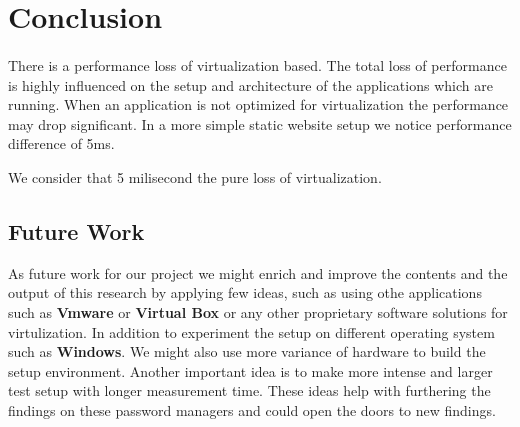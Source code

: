 \section{Conclusion}
\paragraph{}
There is a performance loss of virtualization based. The total loss of performance is highly influenced on the setup and architecture of the applications which are running. When an application is not optimized for virtualization the performance may drop significant. In a more simple static website setup we notice performance difference of 5ms.
\par
We consider that 5 milisecond the pure loss of virtualization.

\subsection{Future Work}
As future work for our project we might enrich and improve the contents and the output of this research by applying few ideas, such as using othe applications such as \textbf{Vmware} or \textbf{Virtual Box} or any other proprietary software solutions for virtulization.  In addition to experiment the setup on different operating system such as \textbf{Windows}. We might also use more variance of hardware to build the setup environment. Another important idea is to make more intense and larger test setup with longer measurement time. These ideas help with furthering the findings on these password managers and could open the doors to new findings.